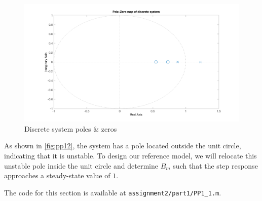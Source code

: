 \begin{figure}
	\centering
	\includegraphics[width=\textwidth]{images/pp12.png}
	\caption{Discrete system poles \& zeros}
	\label{fig:pp12}
\end{figure}

As shown in \autoref{fig:pp12}, the system has a pole located outside the unit circle, indicating that it is unstable. To design our reference model, we will relocate this unstable pole inside the unit circle and determine $B_m$ such that the step response approaches a steady-state value of $1$.

\noindent The code for this section is available at \lstinline|assignment2/part1/PP1_1.m|. 
